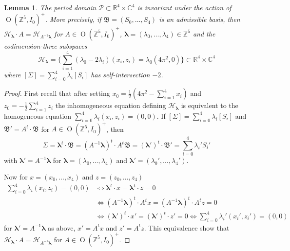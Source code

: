 \documentclass[12pt,letterpaper,reqno]{amsart}
\def\mathbf#1{#1}%
\newtheorem{lem}[thm]{Lemma}
\theoremstyle{remark}
\theoremstyle{definition}
\numberwithin{thm}{section}
\numberwithin{equation}{section}
\numberwithin{figure}{section}
\newcommand{\R}{\ensuremath{\mathbb R}}
\newcommand{\C}{\ensuremath{\mathbb C}}
\newcommand{\Z}{\ensuremath{\mathbb Z}}
\newcommand{\calP}{\mathcal P}
\DeclareMathOperator{\OO}{O}
\begin{document}
\begin{lem}\label{lem:invariance_period_domain}
The period domain $\calP \subset \R^4 \times \C^4$ is invariant under the action of $\OO(\Z^5,I_0)^+$. More precisely, if $\mathfrak{B} = (S_0, \ldots, S_4)$ is an admissible basis, then $\mathcal{H}_{\boldsymbol{\lambda}} \cdot A = \mathcal{H}_{A^{-1}\boldsymbol{\lambda}}$ for $A \in \OO(\Z^5,I_0)^+$, $\boldsymbol{\lambda} = (\lambda_0, \ldots, \lambda_4) \in \Z^5$ and the codimension-three subspaces
\[
\mathcal{H}_{\boldsymbol{\lambda}} = \bigl\{\sum_{i=1}^4 (\lambda_0 -2 \lambda_i) (x_i,z_i) = \lambda_0( 4 \pi^2, 0) \bigr\} \subset \R^4 \times \C^4 
\]
where $[\Sigma]= \sum_{i=0}^4 \lambda_i [S_i] $ has self-intersection $-2$. 
\end{lem}



\begin{proof}
First recall that after setting $x_0 = \frac{1}{2} ( 4 \pi^2 - \sum_{i=1}^4 x_i)$ and $z_0 = - \frac{1}{2} \sum_{i=1}^4 z_i$ the inhomogeneous equation defining $\mathcal{H}_{\boldsymbol{\lambda}}$ is equivalent to the homogeneous equation $\sum_{i=0}^4 \lambda_i(x_i, z_i) = (0,0)$. If $[\Sigma] = \sum_{i=0}^4 \lambda_i[S_i]$ and $\mathfrak{B}' = A^t \cdot \mathfrak{B}$ for $A \in \OO(\Z^5,I_0)^+$, then
\[
\Sigma = \boldsymbol{\lambda}^t \cdot \mathfrak{B} =(A^{-1} \boldsymbol{\lambda})^t \cdot A^t \mathfrak{B}= (\boldsymbol{\lambda}')^t \cdot \mathfrak{B}' = \sum_{i=0}^4 \lambda_i'S_i'
\]
with $\boldsymbol{\lambda}'  = A^{-1} \boldsymbol{\lambda}$ for $\boldsymbol{\lambda}=(\lambda_0, \ldots, \lambda_4) $ and $\boldsymbol{\lambda}' = (\lambda_0', \ldots, \lambda_4')$. 

Now for $\mathbf{x}=(x_0, \ldots, x_4)$ and $\mathbf{z}=(z_0, \ldots, z_4)$ 
\begin{align*}
\sum_{i=0}^4 \lambda_i(x_i, z_i) = (0,0) &\Longleftrightarrow \boldsymbol{\lambda}^t \cdot \mathbf{x} = \boldsymbol{\lambda}^t \cdot \mathbf{z} = 0 \\
&\Longleftrightarrow (A^{-1} \boldsymbol{\lambda})^t \cdot A^{t}\mathbf{x}  = (A^{-1} \boldsymbol{\lambda})^t \cdot A^{t}\mathbf{z} = 0 \\  
&\Longleftrightarrow (\boldsymbol{\lambda}')^t \cdot \mathbf{x}'  = (\boldsymbol{\lambda}')^t \cdot \mathbf{z}' = 0 \Longleftrightarrow \sum_{i=0}^4 \lambda_i'(x_i', z_i') = (0,0)
\end{align*}
for $\boldsymbol{\lambda}'=A^{-1}\boldsymbol{\lambda}$ as above, $\mathbf{x}' =A^{t} \mathbf{x}$ and $\mathbf{z}' = A^{t}\mathbf{z}$. 
This equivalence show that $\mathcal{H}_{\boldsymbol{\lambda}} \cdot A = \mathcal{H}_{A^{-1}\boldsymbol{\lambda}}$ for $A \in \OO(\Z^5,I_0)^+$. 
\end{proof}
\end{document}
